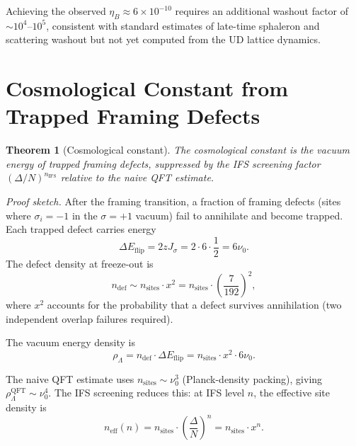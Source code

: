 \documentclass[11pt,twocolumn]{article}
\newtheorem{theorem}{Theorem}
\begin{document}
Achieving the observed $\eta_B\approx 6\times 10^{-10}$ requires an additional washout factor of $\sim 10^{4}$--$10^{5}$, consistent with standard estimates of late-time sphaleron and scattering washout but not yet computed from the UD lattice dynamics.

\section{Cosmological Constant from Trapped Framing Defects}
\label{sec:cc}

\begin{theorem}[Cosmological constant]
\label{thm:cc}
The cosmological constant is the vacuum energy of trapped framing defects, suppressed by the IFS screening factor $(\Delta/N)^{n_{\mathrm{IFS}}}$ relative to the naive QFT estimate.
\end{theorem}

\textit{Proof sketch.}
After the framing transition, a fraction of framing defects (sites where $\sigma_i=-1$ in the $\sigma=+1$ vacuum) fail to annihilate and become trapped.
Each trapped defect carries energy
\begin{equation}
\Delta E_{\mathrm{flip}} = 2zJ_\sigma = 2\cdot 6\cdot\frac{1}{2} = 6\nu_0.
\end{equation}
The defect density at freeze-out is
\begin{equation}
n_{\mathrm{def}}\sim n_{\mathrm{sites}}\cdot x^2 = n_{\mathrm{sites}}\cdot\left(\frac{7}{192}\right)^2,
\end{equation}
where $x^2$ accounts for the probability that a defect survives annihilation (two independent overlap failures required).

The vacuum energy density is
\begin{equation}
\rho_\Lambda = n_{\mathrm{def}}\cdot\Delta E_{\mathrm{flip}} = n_{\mathrm{sites}}\cdot x^2\cdot 6\nu_0.
\end{equation}

The naive QFT estimate uses $n_{\mathrm{sites}}\sim\nu_0^3$ (Planck-density packing), giving $\rho_\Lambda^{\mathrm{QFT}}\sim\nu_0^4$.
The IFS screening reduces this: at IFS level $n$, the effective site density is
\begin{equation}
n_{\mathrm{eff}}(n) = n_{\mathrm{sites}}\cdot\left(\frac{\Delta}{N}\right)^n = n_{\mathrm{sites}}\cdot x^n.
\end{equation}
\end{document}
